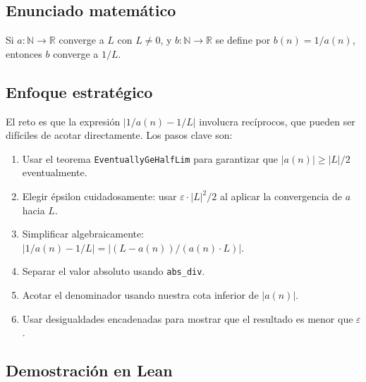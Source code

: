 \subsection{Enunciado matemático}

\begin{theorem}
Si $a : \mathbb{N} \to \mathbb{R}$ converge a $L$ con $L \neq 0$, y $b :
\mathbb{N} \to \mathbb{R}$ se define por $b(n) = 1/a(n)$, entonces $b$
converge a $1/L$.
\end{theorem}

\subsection{Enfoque estratégico}

El reto es que la expresión $|1/a(n) - 1/L|$ involucra recíprocos, que
pueden ser difíciles de acotar directamente. Los pasos clave son:

\begin{enumerate}
  \item Usar el teorema \texttt{EventuallyGeHalfLim} para garantizar que
    $|a(n)| \geq |L|/2$ eventualmente.
  \item Elegir épsilon cuidadosamente: usar $\varepsilon \cdot |L|^2/2$ al
    aplicar la convergencia de $a$ hacia $L$.
  \item Simplificar algebraicamente:
    $|1/a(n) - 1/L| = |(L - a(n))/(a(n) \cdot L)|$.
  \item Separar el valor absoluto usando \texttt{abs\_div}.
  \item Acotar el denominador usando nuestra cota inferior de $|a(n)|$.
  \item Usar desigualdades encadenadas para mostrar que el resultado es
    menor que $\varepsilon$.
\end{enumerate}

\subsection{Demostración en Lean}

